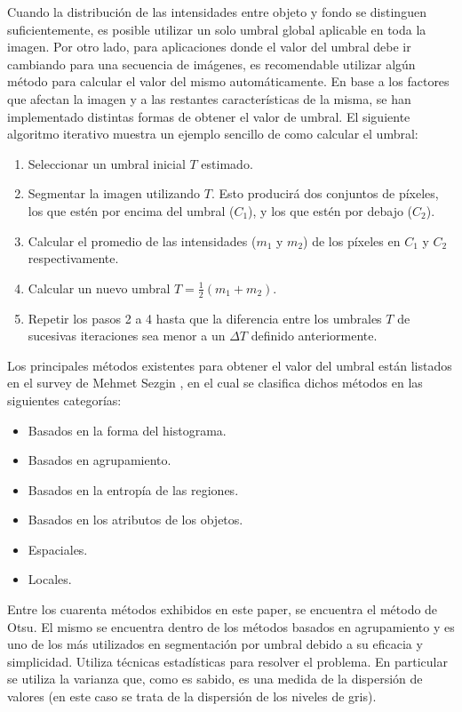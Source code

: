 Cuando la distribución de las intensidades entre objeto y fondo se distinguen suficientemente, es posible utilizar un solo umbral global aplicable en toda la imagen. Por otro lado, para aplicaciones donde el valor del umbral debe ir cambiando para una secuencia de imágenes, es recomendable utilizar algún método para calcular el valor del mismo automáticamente. En base a los factores que afectan la imagen y a las restantes características de la misma, se han implementado distintas formas de obtener el valor de umbral. El siguiente algoritmo iterativo muestra un ejemplo sencillo de como calcular el umbral:

\begin{enumerate}
\item Seleccionar un umbral inicial $T$ estimado.
\item Segmentar la imagen utilizando $T$. Esto producirá dos conjuntos de píxeles, los que estén por encima del umbral ($C_1$), y los que estén por debajo ($C_2$).
\item Calcular el promedio de las intensidades ($m_1$ y $m_2$) de los píxeles en $C_1$ y $C_2$ respectivamente.
\item Calcular un nuevo umbral $T = \frac{1}{2}(m_1 + m_2)$.
\item Repetir los pasos 2 a 4 hasta que la diferencia entre los umbrales $T$ de sucesivas iteraciones sea menor a un ${\Delta}T$ definido anteriormente.
\end{enumerate}

Los principales métodos existentes para obtener el valor del umbral están listados en el survey de Mehmet Sezgin \cite{surveyThreshold}, en el cual se clasifica dichos métodos en las siguientes categorías:
\begin{itemize}
\item Basados en la forma del histograma.
\item Basados en agrupamiento.
\item Basados en la entropía de las regiones.
\item Basados en los atributos de los objetos.
\item Espaciales.
\item Locales.
\end{itemize}

Entre los cuarenta métodos exhibidos en este paper, se encuentra el método de Otsu\cite{otsu}. El mismo se encuentra dentro de los métodos basados en agrupamiento y es uno de los más utilizados en segmentación por umbral debido a su eficacia y simplicidad. Utiliza técnicas estadísticas para resolver el problema. En particular se utiliza la varianza que, como es sabido, es una medida de la dispersión de valores (en este caso se trata de la dispersión de los niveles de gris).

